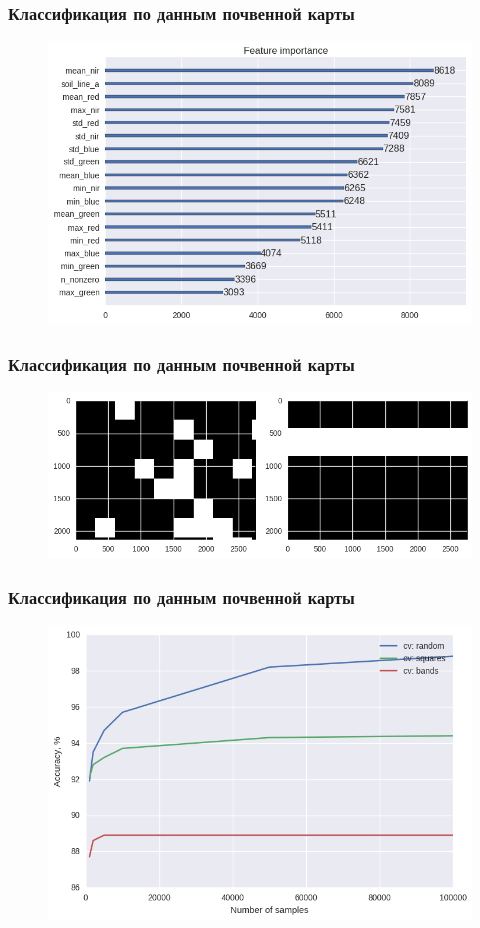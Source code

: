 \documentclass{beamer}
\begin{document}
\begin{frame}
\frametitle{Классификация по данным почвенной карты}
\begin{figure}[H]
\centering
\includegraphics[width=0.8\linewidth]{imgs/map_importance.png}
\end{figure}
\end{frame}

\begin{frame}
\frametitle{Классификация по данным почвенной карты}
\begin{figure}[H]
\centering
\includegraphics[width=0.8\linewidth]{imgs/validation_masks.png}
\end{figure}
\end{frame}

\begin{frame}
\frametitle{Классификация по данным почвенной карты}
\begin{figure}[H]
\centering
\includegraphics[width=0.8\linewidth]{imgs/map_validations_3_classes.png}
\end{figure}
\end{frame}
\end{document}
